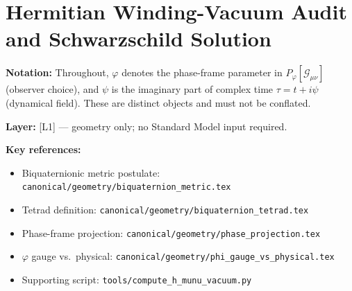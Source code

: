 %
%



\section{Hermitian Winding-Vacuum Audit and Schwarzschild Solution}
\label{sec:biq_vacuum_solutions}

\noindent\textbf{Notation:} Throughout, $\varphi$ denotes the phase-frame parameter in
$P_\varphi[\mathcal{G}_{\mu\nu}]$ (observer choice), and $\psi$ is the imaginary part of complex
time $\tau = t + i\psi$ (dynamical field).  These are distinct objects and must not be conflated.

\noindent\textbf{Layer:} [L1] — geometry only; no Standard Model input required.

\noindent\textbf{Key references:}
\begin{itemize}
  \item Biquaternionic metric postulate: \texttt{canonical/geometry/biquaternion\_metric.tex}
  \item Tetrad definition: \texttt{canonical/geometry/biquaternion\_tetrad.tex}
  \item Phase-frame projection: \texttt{canonical/geometry/phase\_projection.tex}
  \item $\varphi$ gauge vs.\ physical: \texttt{canonical/geometry/phi\_gauge\_vs\_physical.tex}
  \item Supporting script: \texttt{tools/compute\_h\_munu\_vacuum.py}
\end{itemize}

